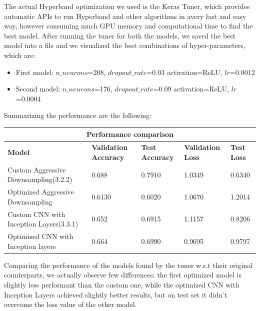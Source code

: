 The actual Hyperband optimization we used is the Keras Tuner, which provides automatic APIs to run Hyperband and other algorithms in avery fast and easy way, however consuming much GPU memory and computational time to find the best model. After running the tuner for both the models, we saved the best model into a file and we visualized the best combinations of hyper-parameters, which are:
\begin{itemize}
\item First model: $n\_neurons$=208, $dropout\_rate$=0.03 activation=ReLU, $lr$=0.0012
\item Second model: $n\_neurons$=176, $dropout\_rate$=0.09 activation=ReLU, $lr$=0.0004
\end{itemize}

\noindent Summarizing the performance are the following:


\begin{tabular}{ |p{5cm}|p{2cm}|p{2cm}|p{2cm}|p{2cm}|  }
\hline
\multicolumn{5}{|c|}{Performance comparison} \\
\hline
\textbf{Model} & \textbf{Validation Accuracy} & \textbf{Test Accuracy} & \textbf{Validation Loss} & \textbf{Test Loss} \\
\hline
Custom Aggressive Downsampling(3.2.2) & 0.688 & 0.7910 & 1.0349 & 0.6340\\
\hline
Optimized Aggressive Downsampling & 0.6130 & 0.6020 & 1.0670 & 1.2014\\
\hline
Custom CNN with Inception Layers(3.3.1) & 0.652 & 0.6915 & 1.1157 & 0.8206\\
\hline
Optimized CNN with Inception layers & 0.664 & 0.6990 & 0.9695 & 0.9797\\
\hline
\end{tabular}

\medskip 

\noindent Comparing the performance of the models found by the tuner w.r.t their original counterparts, we actually observe few differences: the first optimized model is slightly less performant than the custom one, while the optimized CNN with Inception Layers achieved slightly better results, but on test set it didn't overcome the loss value of the other model.

